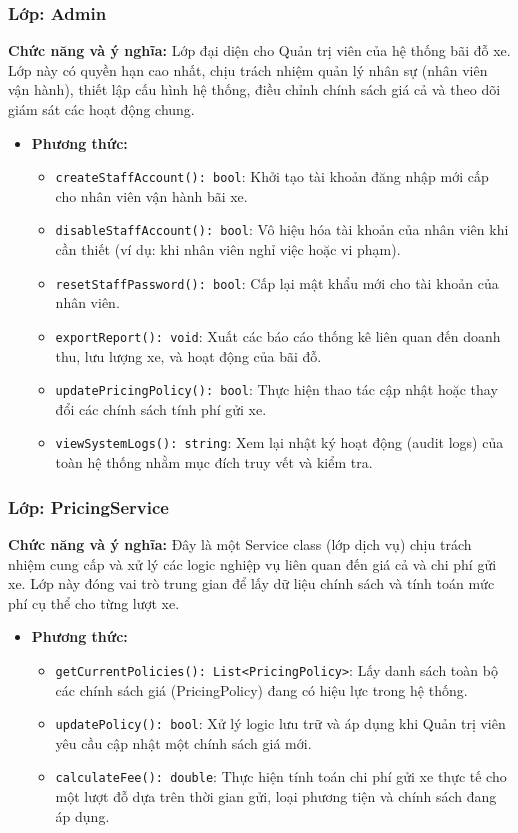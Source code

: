 \subsubsection{Lớp: Admin}
\textbf{Chức năng và ý nghĩa:} Lớp đại diện cho Quản trị viên của hệ thống bãi đỗ xe. Lớp này có quyền hạn cao nhất, chịu trách nhiệm quản lý nhân sự (nhân viên vận hành), thiết lập cấu hình hệ thống, điều chỉnh chính sách giá cả và theo dõi giám sát các hoạt động chung.
\begin{itemize}
    \item \textbf{Phương thức:}
    \begin{itemize}
        \item \texttt{createStaffAccount(): bool}: Khởi tạo tài khoản đăng nhập mới cấp cho nhân viên vận hành bãi xe.
        \item \texttt{disableStaffAccount(): bool}: Vô hiệu hóa tài khoản của nhân viên khi cần thiết (ví dụ: khi nhân viên nghỉ việc hoặc vi phạm).
        \item \texttt{resetStaffPassword(): bool}: Cấp lại mật khẩu mới cho tài khoản của nhân viên.
        \item \texttt{exportReport(): void}: Xuất các báo cáo thống kê liên quan đến doanh thu, lưu lượng xe, và hoạt động của bãi đỗ.
        \item \texttt{updatePricingPolicy(): bool}: Thực hiện thao tác cập nhật hoặc thay đổi các chính sách tính phí gửi xe.
        \item \texttt{viewSystemLogs(): string}: Xem lại nhật ký hoạt động (audit logs) của toàn hệ thống nhằm mục đích truy vết và kiểm tra.
    \end{itemize}
\end{itemize}

\subsubsection{Lớp: PricingService}
\textbf{Chức năng và ý nghĩa:} Đây là một Service class (lớp dịch vụ) chịu trách nhiệm cung cấp và xử lý các logic nghiệp vụ liên quan đến giá cả và chi phí gửi xe. Lớp này đóng vai trò trung gian để lấy dữ liệu chính sách và tính toán mức phí cụ thể cho từng lượt xe.
\begin{itemize}
    \item \textbf{Phương thức:}
    \begin{itemize}
        \item \texttt{getCurrentPolicies(): List<PricingPolicy>}: Lấy danh sách toàn bộ các chính sách giá (PricingPolicy) đang có hiệu lực trong hệ thống.
        \item \texttt{updatePolicy(): bool}: Xử lý logic lưu trữ và áp dụng khi Quản trị viên yêu cầu cập nhật một chính sách giá mới.
        \item \texttt{calculateFee(): double}: Thực hiện tính toán chi phí gửi xe thực tế cho một lượt đỗ dựa trên thời gian gửi, loại phương tiện và chính sách đang áp dụng.
    \end{itemize}
\end{itemize}

